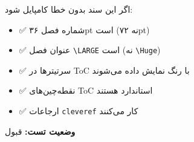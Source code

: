 \documentclass{matinbook}
\begin{document}
اگر این سند بدون خطا کامپایل شود:

\begin{itemize}
    \item ✅ شماره فصل ۳۶pt است (نه ۷۲pt)
    \item ✅ عنوان فصل \texttt{\textbackslash LARGE} است (نه \texttt{\textbackslash Huge})
    \item ✅ سرتیترها در ToC با رنگ نمایش داده می‌شوند
    \item ✅ نقطه‌چین‌های ToC استاندارد هستند
    \item ✅ ارجاعات \texttt{cleveref} کار می‌کنند
\end{itemize}

\textbf{وضعیت تست:} قبول
\end{document}
